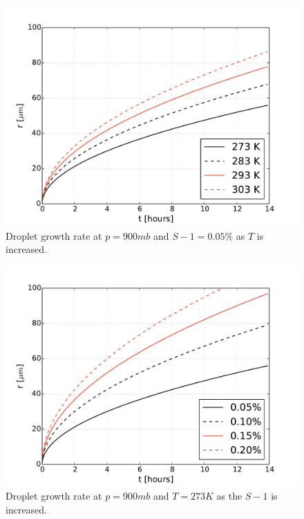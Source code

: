 \documentclass[]{article}
\begin{document}
\begin{figure}
    \centering
    \includegraphics[width=\textwidth]{r_t_temperature.pdf}
    \caption{Droplet growth rate at $p=900 mb$ and $S - 1 = 0.05\%$ as $T$ is increased.}
    \label{fig:temperature}
\end{figure}


\begin{figure}
    \centering
    \includegraphics[width=\textwidth]{r_t_supersaturation.pdf}
    \caption{Droplet growth rate at $p=900 mb$ and $T= 273 K$ as the $S - 1$ is increased.}
    \label{fig:supersaturation}
\end{figure}


\end{document}

